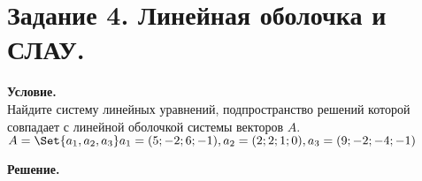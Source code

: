 \section{Задание 4. Линейная оболочка и СЛАУ.}

\textbf{Условие.}\\
Найдите систему линейных уравнений, подпространство решений которой совпадает с линейной
оболочкой системы векторов $A$.\\
$A = \Set{a_1, a_2, a_3}\\
a_1 = (5; -2; 6; -1),\\
a_2 = (2; 2; 1; 0),\\
a_3 = (9; -2; -4; -1)$

\vspace{10mm}
\noindent\textbf{Решение.}\\


